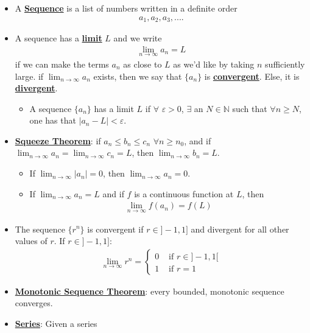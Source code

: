 \documentclass[11pt]{article}
\newcommand{\dfn}[1]{\underline{\textbf{#1}}}
\begin{document}
\begin{itemize}[noitemsep]
	\item A \dfn{Sequence} is a list of numbers written in a definite order
	\begin{align}
		a_1, a_2, a_3, ....	
	\end{align}
	\item A sequence has a \dfn{limit} $L$ and we write
	\begin{align*}
		\lim_{n \rightarrow \infty} a_n = L 
	\end{align*}
	if we can make the terms $a_n$ as close to $L$ as we'd like by taking $n$ sufficiently large. if $\lim_{n \rightarrow \infty} a_n$ exists, then we say that $\{ a_n \}$ is \dfn{convergent}. Else, it is \dfn{divergent}. 
	\begin{itemize}
		\item A sequence $\{ a_n \}$ has a limit $L$ if $\forall$ $\varepsilon > 0$, $\exists$ an $N \in \mathbb{N}$ such that $\forall n \geq N$, one has that $|a_n - L| < \varepsilon$. 
	\end{itemize}
	\item \dfn{Squeeze Theorem}: if $a_n \leq b_n \leq c_n$ $\forall n \geq n_0$, and if $\lim_{n \rightarrow \infty} a_n = \lim_{n \rightarrow \infty} c_n =L$, then $\lim_{n \rightarrow \infty} b_n =L$. 
	\begin{itemize}[noitemsep]
		\item If $\lim_{n \rightarrow \infty} |a_n| = 0$, then $\lim_{n \rightarrow \infty} a_n = 0$. 
		\item If $\lim_{n \rightarrow \infty} a_n = L$ and if $f$ is a continuous function at $L$, then
		\begin{align*}
			\lim_{n \rightarrow \infty} f(a_n) = f(L) 
		\end{align*}
	\end{itemize}
	\item The sequence $\{ r^n \}$ is convergent if $r \in ]-1, 1]$ and divergent for all other values of $r$. If $r \in ]-1, 1]$: 
	\begin{align*}
		\lim_{n \rightarrow \infty} r^n = \begin{cases}
			0 & \text{ if } r \in ]-1, 1[ \\
			1 & \text{ if } r = 1
		\end{cases}
	\end{align*}
	\item \dfn{Monotonic Sequence Theorem}: every bounded, monotonic sequence converges. 
	\item \dfn{Series}: Given a series

\end{itemize}
\end{document}
